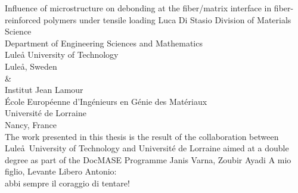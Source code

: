 \documentclass[12pt,a4paper,openright,final,twoside]{msethesis}
\begin{document}
\newrefsection


\def\thesistitle{Influence of microstructure on debonding at the fiber/matrix interface in fiber-reinforced polymers under tensile loading}
\def\theauthor{Luca Di Stasio}
\def\theaddress{Division of Materials Science\\Department of Engineering Sciences and Mathematics\\
Lule{\aa} University of Technology\\ Lule{\aa}, Sweden\\[5pt]\&\\[5pt]Institut Jean Lamour\\\'Ecole Europ\'eenne d'Ing\'enieurs en G\'enie des Mat\'eriaux\\Universit\'e de Lorraine\\Nancy, France\\[10mm]The work presented in this thesis is the result of the collaboration between Lule\aa\ University of Technology and Universit\'e de Lorraine aimed at a double degree as part of the DocMASE Programme}

\def\supervisors{Janis Varna, Zoubir Ayadi}
\def\supervisorstring{Supervisors:} %
\def\dedication{A mio figlio, Levante Libero Antonio:\\ abbi sempre il coraggio di tentare!}

\def\theabstract{}
\def\thepreface{}



\def\thelogo{} %


\startpreamble
  {\thesistitle}
  {\theauthor}
  {\theaddress}
  {\supervisors}
  {\dedication}
  {\theabstract}
  {\thepreface}
  {\thelogo}

\end{document}

